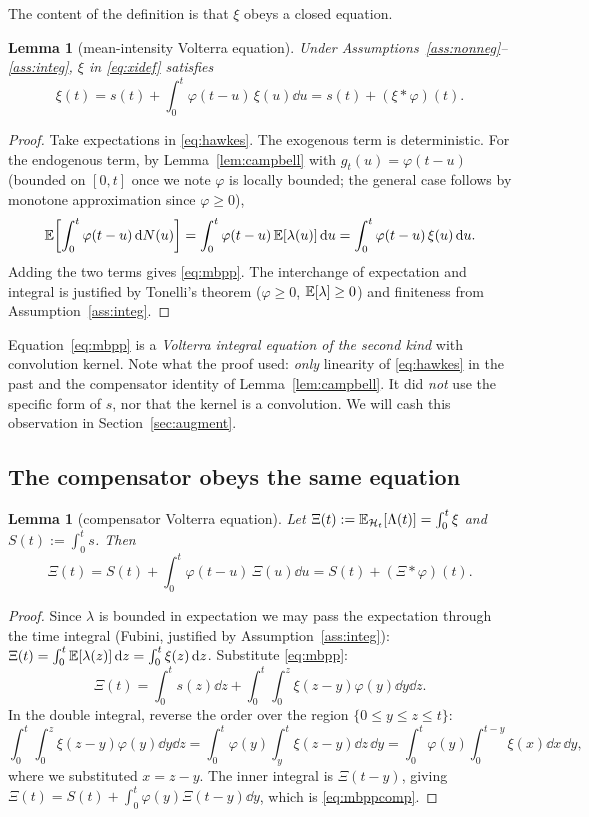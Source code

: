 \documentclass[11pt]{article}
\theoremstyle{plain}
\newtheorem{lemma}[theorem]{Lemma}
\theoremstyle{definition}
\theoremstyle{remark}
\newcommand{\Hist}{\mathcal{H}}\newcommand{\Filt}{\mathcal{F}}\newcommand{\conv}{\ast}
\begin{document}
The content of the definition is that $\xi$ obeys a closed equation.

\begin{lemma}[mean-intensity Volterra equation]
\label{lem:mean}
Under Assumptions~\ref{ass:nonneg}--\ref{ass:integ}, $\xi$ in \eqref{eq:xidef}
satisfies
\begin{equation}
\xi(t)=s(t)+\int_0^t\varphi(t-u)\,\xi(u)\dd u = s(t)+(\xi\conv\varphi)(t).
\label{eq:mbpp}
\end{equation}
\end{lemma}
\begin{proof}
Take expectations in \eqref{eq:hawkes}. The exogenous term is deterministic. For
the endogenous term, by Lemma~\ref{lem:campbell} with $g_t(u)=\varphi(t-u)$
(bounded on $[0,t]$ once we note $\varphi$ is locally bounded; the general case
follows by monotone approximation since $\varphi\ge0$),
\[
\mathbb{E}\!\left[\int_0^t\varphi(t-u)\,\mathrm{d} N(u)\right]
=\int_0^t\varphi(t-u)\,\mathbb{E}[\lambda(u)]\,\mathrm{d} u
=\int_0^t\varphi(t-u)\,\xi(u)\,\mathrm{d} u .
\]
Adding the two terms gives \eqref{eq:mbpp}. The interchange of expectation and
integral is justified by Tonelli's theorem ($\varphi\ge0$, $\mathbb{E}[\lambda]\ge0$) and
finiteness from Assumption~\ref{ass:integ}.
\end{proof}

Equation~\eqref{eq:mbpp} is a \emph{Volterra integral equation of the second
kind} with convolution kernel. Note what the proof used: \emph{only} linearity of
\eqref{eq:hawkes} in the past and the compensator identity of
Lemma~\ref{lem:campbell}. It did \emph{not} use the specific form of $s$, nor
that the kernel is a convolution. We will cash this observation in
Section~\ref{sec:augment}.

\subsection{The compensator obeys the same equation}

\begin{lemma}[compensator Volterra equation]
\label{lem:comp}
Let $\Xi(t):=\E_{\Hist_t}[\Lambda(t)]=\int_0^t\xi$ and $S(t):=\int_0^t s$. Then
\begin{equation}
\Xi(t)=S(t)+\int_0^t\varphi(t-u)\,\Xi(u)\dd u=S(t)+(\Xi\conv\varphi)(t).
\label{eq:mbppcomp}
\end{equation}
\end{lemma}
\begin{proof}
Since $\lambda$ is bounded in expectation we may pass the expectation through the
time integral (Fubini, justified by Assumption~\ref{ass:integ}):
$\Xi(t)=\int_0^t\mathbb{E}[\lambda(z)]\,\mathrm{d} z=\int_0^t\xi(z)\,\mathrm{d} z$. Substitute
\eqref{eq:mbpp}:
\[
\Xi(t)=\int_0^t s(z)\dd z+\int_0^t\!\!\int_0^z\xi(z-y)\varphi(y)\dd y\dd z .
\]
In the double integral, reverse the order over the region $\{0\le y\le z\le t\}$:
\[
\int_0^t\!\!\int_0^z\xi(z-y)\varphi(y)\dd y\dd z
=\int_0^t\varphi(y)\!\int_y^t\xi(z-y)\dd z\,\dd y
=\int_0^t\varphi(y)\!\int_0^{t-y}\xi(x)\dd x\,\dd y,
\]
where we substituted $x=z-y$. The inner integral is $\Xi(t-y)$, giving
$\Xi(t)=S(t)+\int_0^t\varphi(y)\Xi(t-y)\dd y$, which is \eqref{eq:mbppcomp}.
\end{proof}
\end{document}
